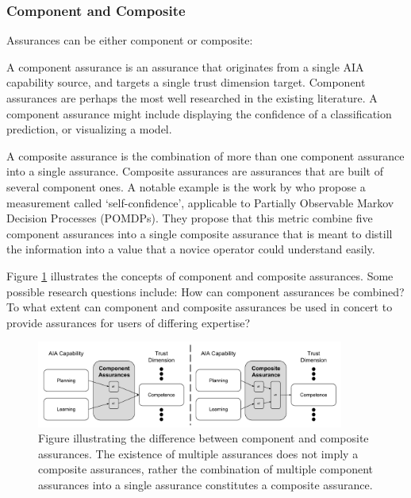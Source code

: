 \subsubsection{Component and Composite}
Assurances can be either component or composite:

A component assurance is an assurance that originates from a single AIA capability source, and targets a single trust dimension target. Component assurances are perhaps the most well researched in the existing literature. A component assurance might include displaying the confidence of a classification prediction, or visualizing a model.

A composite assurance is the combination of more than one component assurance into a single assurance. Composite assurances are assurances that are built of several component ones. A notable example is the work by \citet{Aitken2016-cv} who propose a measurement called `self-confidence', applicable to Partially Observable Markov Decision Processes (POMDPs). They propose that this metric combine five component assurances into a single composite assurance that is meant to distill the information into a value that a novice operator could understand easily.

Figure \ref{fig:assurance_mapping} illustrates the concepts of component and composite assurances. Some possible research questions include: How can component assurances be combined? To what extent can component and composite assurances be used in concert to provide assurances for users of differing expertise?

\begin{figure}[!htbp]
    \centering
    \includegraphics[width=0.9\textwidth]{Figures/Assurance_component_composite.pdf}
    \caption{Figure illustrating the difference between component and composite assurances. The existence of multiple assurances does not imply a composite assurances, rather the combination of multiple component assurances into a single assurance constitutes a composite assurance.}
    \label{fig:assurance_mapping}
\end{figure}
